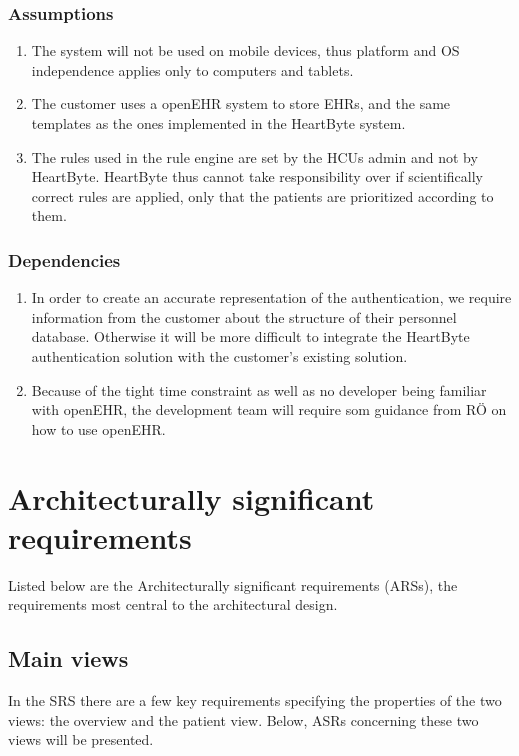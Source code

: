 \documentclass{article}
\begin{document}
\subsubsection{Assumptions}
\begin{enumerate}[label=(\roman*)]
\item The system will not be used on mobile devices, thus platform and OS independence applies only to computers and tablets. 
\item The customer uses a openEHR system to store EHRs, and the same templates as the ones implemented in the HeartByte system.
\item The rules used in the rule engine are set by the HCUs admin and not by HeartByte. HeartByte thus cannot take responsibility over if scientifically correct rules are applied, only that the patients are prioritized according to them.
\end{enumerate}
\subsubsection{Dependencies}
\begin{enumerate}[label=(\roman*)]
\item In order to create an accurate representation of the authentication, we require information from the customer about the structure of their personnel database. Otherwise it will be more difficult to integrate the HeartByte authentication solution with the customer's existing solution.
\item Because of the tight time constraint as well as no developer being familiar with openEHR, the development team will require som guidance from RÖ on how to use openEHR.

\end{enumerate}

\section{Architecturally significant requirements}
Listed below are the Architecturally significant requirements (ARSs), the requirements most central to the architectural design. 

\subsection{Main views}
In the SRS there are a few key requirements specifying the properties of the two views: the overview and the patient view. Below, ASRs concerning these two views will be presented.
\end{document}

